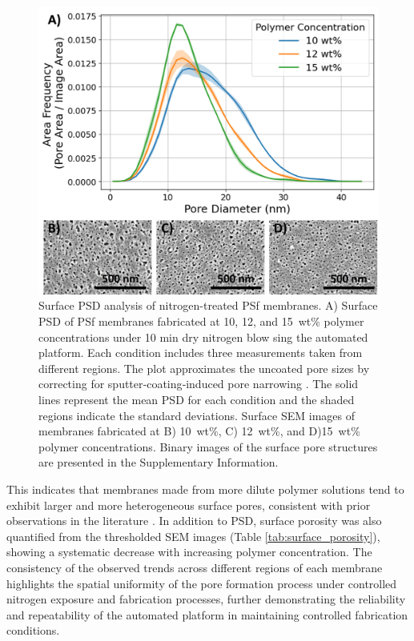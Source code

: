 \documentclass[preprint,12pt,times]{elsarticle}
\begin{document}
\begin{figure}[!ht]
\centering
\includegraphics[width=\linewidth]{PSD.jpg}
\caption{Surface PSD analysis of nitrogen-treated PSf membranes. A) Surface PSD of PSf membranes fabricated at 10, 12, and 15~wt\% polymer concentrations under 10 min dry nitrogen blow sing the automated platform. Each condition includes three measurements taken from different regions. The plot approximates the uncoated pore sizes by correcting for sputter‑coating‑induced pore narrowing \cite{SIMA2025}. The solid lines represent the mean PSD for each condition and the shaded regions indicate the standard deviations. Surface SEM images of membranes fabricated at B) 10~wt\%, C) 12~wt\%, and D)15~wt\% polymer concentrations. Binary images of the surface pore structures are presented in the Supplementary Information.}
\label{PSD.jpg}
\end{figure}

This indicates that membranes made from more dilute polymer solutions tend to exhibit larger and more heterogeneous surface pores, consistent with prior observations in the literature \cite{ZOLFAGHARI2018813}. In addition to PSD, surface porosity was also quantified from the thresholded SEM images (Table \ref{tab:surface_porosity}), showing a systematic decrease with increasing polymer concentration. The consistency of the observed trends across different regions of each membrane highlights the spatial uniformity of the pore formation process under controlled nitrogen exposure and fabrication processes, further demonstrating the reliability and repeatability of the automated platform in maintaining controlled fabrication conditions. 
\end{document}
